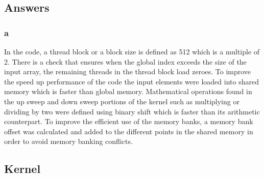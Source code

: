 \documentclass{article}
\begin{document}
\subsection{Answers}
\subsubsection{a}
In the code, a thread block or a block size is defined as 512 which is a multiple of 2. There is a check that ensures when the global index exceeds the size of the input array, the remaining threads in the thread block load zeroes. To improve the speed up performance of the code the input elements were loaded into shared memory which is faster than global memory. Mathematical operations found in the up sweep and down sweep portions of the kernel such as multiplying or dividing by two were defined using binary shift which is faster than its arithmetic counterpart. To improve the efficient use of the memory banks, a memory bank offset was calculated and added to the different points in the shared memory in order to avoid memory banking conflicts.

\subsection{Kernel} 
\inputminted[breaklines, linenos]{c}{./prefix-scan-kernel.cu}
\end{document}
